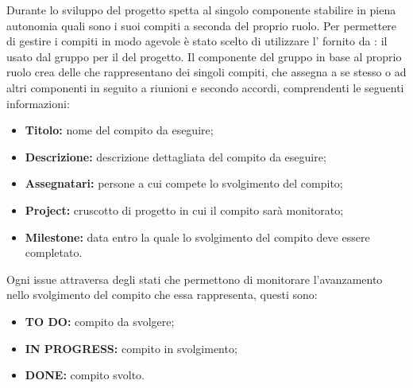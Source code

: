 \label{GestioneCompiti}Durante lo sviluppo del progetto spetta al singolo componente stabilire in piena autonomia quali sono i suoi compiti a seconda del proprio ruolo.
Per permettere di gestire i compiti in modo agevole è stato scelto di utilizzare l' fornito da : il  usato dal gruppo per il  del progetto.
Il componente del gruppo in base al proprio ruolo crea delle  che rappresentano dei singoli compiti, che assegna a se stesso o ad altri componenti in seguito a riunioni e secondo accordi, comprendenti le seguenti informazioni:
\begin{itemize}
	\item \textbf{Titolo:} nome del compito da eseguire;
	\item \textbf{Descrizione:} descrizione dettagliata del compito da eseguire;
	\item \textbf{Assegnatari:} persone a cui compete lo svolgimento del compito;
	\item \textbf{Project:} cruscotto di progetto in cui il compito sarà monitorato;
	\item \textbf{Milestone:} data entro la quale lo svolgimento del compito deve essere completato.
\end{itemize}
Ogni issue attraversa degli stati che permettono di monitorare l'avanzamento nello svolgimento del compito che essa rappresenta, questi sono:
\begin{itemize}
	\item \textbf{TO DO:} compito da svolgere;
	\item \textbf{IN PROGRESS:} compito in svolgimento;
	\item \textbf{DONE:} compito svolto.
\end{itemize}

